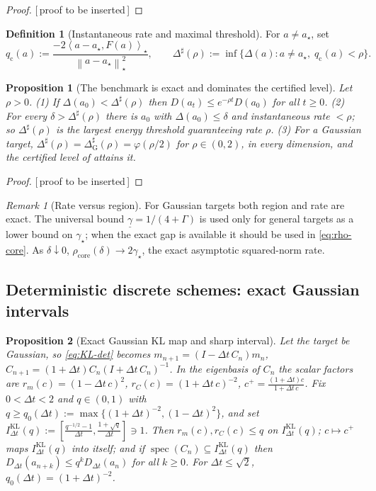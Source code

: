 \documentclass[11pt]{article}
\theoremstyle{plain}
\newtheorem{proposition}[proposition]{Proposition}
\theoremstyle{definition}
\newtheorem{definition}[definition]{Definition}
\theoremstyle{remark}
\newtheorem{remark}[remark]{Remark}
\newcommand{\Id}{I}
\newcommand{\norm}[1]{\left\lVert #1\right\rVert}
\newcommand{\inner}[2]{\left\langle #1,#2\right\rangle}
\newcommand{\gstar}{\gamma_\star}
\newcommand{\gund}{\underline{\gamma}}
\newcommand{\sharpthr}{\Delta^{\sharp}}
\newcommand{\PROOFHOLE}{{\color{red}\textsf{[\,proof to be inserted\,]}}}
\begin{document}
\begin{proof}
\PROOFHOLE
\end{proof}

\begin{definition}[Instantaneous rate and maximal threshold]
\label{def:sharp}
For $a\neq a_\star$, set
\[
    q_{\mathrm c}(a):=\frac{-2\inner{a-a_\star}{F(a)}_\star}{\norm{a-a_\star}_\star^2},
    \qquad
    \sharpthr(\rho):=\inf\{\Delta(a):a\neq a_\star,\;q_{\mathrm c}(a)<\rho\}.
\]
\end{definition}

\begin{proposition}[The benchmark is exact and dominates the certified level]
\label{prop:sharp}
Let $\rho>0$. (1) If $\Delta(a_0)<\sharpthr(\rho)$ then $D(a_t)\leq e^{-\rho t}D(a_0)$ for all
$t\geq0$. (2) For every $\delta>\sharpthr(\rho)$ there is $a_0$ with $\Delta(a_0)\leq\delta$ and
instantaneous rate $<\rho$; so $\sharpthr(\rho)$ is the largest energy threshold guaranteeing rate
$\rho$. (3) For a Gaussian target, $\sharpthr(\rho)=\sharpthr_{\mathrm G}(\rho)=\varphi(\rho/2)$ for
$\rho\in(0,2)$, in every dimension, and the certified level of  attains it.
\end{proposition}

\begin{proof}
\PROOFHOLE
\end{proof}

\begin{remark}[Rate versus region]
\label{rem:rate-region}
For Gaussian targets both region and rate are exact. The universal bound $\gund=1/(4+\Gamma)$ is
used only for general targets as a lower bound on $\gstar$; when the exact gap is available it
should be used in \eqref{eq:rho-core}. As $\delta\downarrow0$, $\rho_{\mathrm{core}}(\delta)\to2\gstar$,
the exact asymptotic squared-norm rate.
\end{remark}

\subsection{Deterministic discrete schemes: exact Gaussian intervals}
\label{subsec:disc-local}

\begin{proposition}[Exact Gaussian KL map and sharp interval]
\label{prop:kl-gauss}
Let the target be Gaussian, so \eqref{eq:KL-det} becomes
$m_{n+1}=(\Id-\Delta t\,C_n)m_n$, $C_{n+1}=(1+\Delta t)C_n(\Id+\Delta t\,C_n)^{-1}$. In the
eigenbasis of $C_n$ the scalar factors are
$r_m(c)=(1-\Delta t\,c)^2$, $r_C(c)=(1+\Delta t\,c)^{-2}$, $c^+=\tfrac{(1+\Delta t)c}{1+\Delta t\,c}$.
Fix $0<\Delta t<2$ and $q\in(0,1)$ with $q\geq q_0(\Delta t):=\max\{(1+\Delta t)^{-2},(1-\Delta t)^2\}$,
and set $I_{\Delta t}^{\mathrm{KL}}(q):=[\tfrac{q^{-1/2}-1}{\Delta t},\tfrac{1+\sqrt q}{\Delta t}]\ni1$.
Then $r_m(c),r_C(c)\leq q$ on $I_{\Delta t}^{\mathrm{KL}}(q)$; $c\mapsto c^+$ maps
$I_{\Delta t}^{\mathrm{KL}}(q)$ into itself; and if $\operatorname{spec}(C_n)\subseteq I_{\Delta t}^{\mathrm{KL}}(q)$
then $D_{\Delta t}(a_{n+k})\leq q^kD_{\Delta t}(a_n)$ for all $k\geq0$. For $\Delta t\leq\sqrt2$,
$q_0(\Delta t)=(1+\Delta t)^{-2}$.
\end{proposition}
\end{document}
